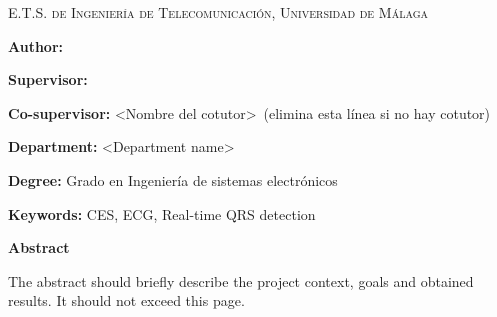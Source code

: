 
\pagestyle{fancy}

\begin{center}
	\scshape
	E.T.S. de Ingeniería de Telecomunicación, Universidad de Málaga
\end{center}

\bigskip

\begin{center}
	\Large \scshape
	\textbf{\tfgtitlenameENG}
\end{center}

\bigskip \bigskip \bigskip

\begin{minipage}{\textwidth}

\textbf{Author:} \tfgauthorname

\medskip

\textbf{Supervisor:} \tfgtutorname

\medskip

\textbf{Co-supervisor:} <Nombre del cotutor>\ (elimina esta línea si no hay cotutor)

\medskip

\textbf{Department:} <Department name>

\medskip

\textbf{Degree:} Grado en Ingeniería de sistemas electrónicos

\medskip

\textbf{Keywords:} CES, ECG, Real-time QRS detection

\bigskip \bigskip


\end{minipage}

\begin{center}
	\textbf{Abstract}
\end{center}

The abstract should briefly describe the project context, goals and
obtained results. It should not exceed this page.

\blankpage

